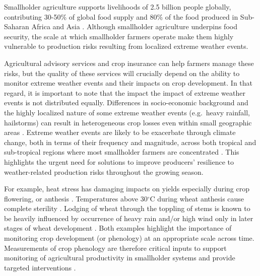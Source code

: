 \documentclass[, manuscript]{copernicus}
\begin{document}
\introduction[Introduction]

Smallholder agriculture supports livelihoods of 2.5 billion people
globally, contributing 30-50\% of global food supply and 80\% of the
food produced in Sub-Saharan Africa and Asia
\citep{ifad2013, lowder2016}. Although smallholder agriculture underpins
food security, the scale at which smallholder farmers operate make them
highly vulnerable to production risks resulting from localized extreme
weather events.

Agricultural advisory services and crop insurance can help farmers
manage these risks, but the quality of these services will crucially
depend on the ability to monitor extreme weather events and their
impacts on crop development. In that regard, it is important to note
that the impact the impact of extreme weather events is not distributed
equally. Differences in socio-economic background and the highly
localized nature of some extreme weather events (e.g.~heavy rainfall,
hailstorms) can result in heterogeneous crop losses even within small
geographic areas \citep{below2012, fishman2016, ifad2013, jain2015}.
Extreme weather events are likely to be exacerbate through climate
change, both in terms of their frequency and magnitude, across both
tropical and sub-tropical regions where most smallholder farmers are
concentrated \citep{auffhammer2012, harvey2014, morton2007}. This
highlights the urgent need for solutions to improve producers'
resilience to weather-related production risks throughout the growing
season.

For example, heat stress has damaging impacts on yields especially
during crop flowering, or anthesis \citep{lobell2011}. Temperatures
above 30\(^\circ\)C during wheat anthesis cause complete sterility
\citep{farooq2011, saini1982}. Lodging of wheat through the toppling of
stems is known to be heavily influenced by occurrence of heavy rain
and/or high wind only in later stages of wheat development
\citep{berry2003, gent1997, vera2012}. Both examples highlight the
importance of monitoring crop development (or phenology) at an
appropriate scale across time. Measurements of crop phenology are
therefore critical inputs to support monitoring of agricultural
productivity in smallholder systems and provide targeted interventions
\citep{auffhammer2012, carletto2015, harvey2014, morton2007}.
\end{document}
